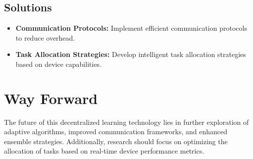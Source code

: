 \documentclass{article}
\begin{document}
\subsection{Solutions}

\begin{itemize}
  \item \textbf{Communication Protocols:} Implement efficient communication protocols to reduce overhead.
  \item \textbf{Task Allocation Strategies:} Develop intelligent task allocation strategies based on device capabilities.
\end{itemize}

\section{Way Forward}

The future of this decentralized learning technology lies in further exploration of adaptive algorithms, improved communication frameworks, and enhanced ensemble strategies. Additionally, research should focus on optimizing the allocation of tasks based on real-time device performance metrics.
\end{document}
